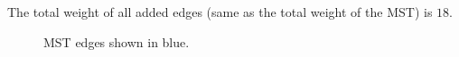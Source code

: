 \documentclass[jou]{apa6}
\begin{document}
The total weight of all added edges (same as the total weight of the MST) is $18$. 


\begin{figure}[!htb]
\caption{\label{fig:prim-weighted-mst} MST edges shown in blue.}
\end{figure}
\end{document}
